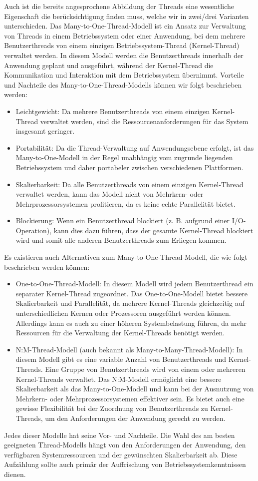 Auch ist die bereits angesprochene Abbildung der Threads eine wesentliche Eigenschaft die berücksichtigung finden muss, welche wir in zwei/drei Varianten unterschieden. Das Many-to-One-Thread-Modell ist ein Ansatz zur Verwaltung von Threads in einem Betriebssystem oder einer Anwendung, bei dem mehrere Benutzerthreads von einem einzigen Betriebssystem-Thread (Kernel-Thread) verwaltet werden. In diesem Modell werden die Benutzerthreads innerhalb der Anwendung geplant und ausgeführt, während der Kernel-Thread die Kommunikation und Interaktion mit dem Betriebssystem übernimmt. Vorteile und Nachteile des Many-to-One-Thread-Modells können wir folgt beschrieben werden:
\begin{itemize}
\item Leichtgewicht: Da mehrere Benutzerthreads von einem einzigen Kernel-Thread verwaltet werden, sind die Ressourcenanforderungen für das System insgesamt geringer.
\item Portabilität: Da die Thread-Verwaltung auf Anwendungsebene erfolgt, ist das Many-to-One-Modell in der Regel unabhängig vom zugrunde liegenden Betriebssystem und daher portabeler zwischen verschiedenen Plattformen.
\item Skalierbarkeit: Da alle Benutzerthreads von einem einzigen Kernel-Thread verwaltet werden, kann das Modell nicht von Mehrkern- oder Mehrprozessorsystemen profitieren, da es keine echte Parallelität bietet.
\item Blockierung: Wenn ein Benutzerthread blockiert (z. B. aufgrund einer I/O-Operation), kann dies dazu führen, dass der gesamte Kernel-Thread blockiert wird und somit alle anderen Benutzerthreads zum Erliegen kommen.
\end{itemize}
Es existieren auch Alternativen zum Many-to-One-Thread-Modell, die wie folgt beschrieben werden können:
\begin{itemize}
\item One-to-One-Thread-Modell: In diesem Modell wird jedem Benutzerthread ein separater Kernel-Thread zugeordnet. Das One-to-One-Modell bietet bessere Skalierbarkeit und Parallelität, da mehrere Kernel-Threads gleichzeitig auf unterschiedlichen Kernen oder Prozessoren ausgeführt werden können. Allerdings kann es auch zu einer höheren Systembelastung führen, da mehr Ressourcen für die Verwaltung der Kernel-Threads benötigt werden.
\item N:M-Thread-Modell (auch bekannt als Many-to-Many-Thread-Modell): In diesem Modell gibt es eine variable Anzahl von Benutzerthreads und Kernel-Threads. Eine Gruppe von Benutzerthreads wird von einem oder mehreren Kernel-Threads verwaltet. Das N:M-Modell ermöglicht eine bessere Skalierbarkeit als das Many-to-One-Modell und kann bei der Ausnutzung von Mehrkern- oder Mehrprozessorsystemen effektiver sein. Es bietet auch eine gewisse Flexibilität bei der Zuordnung von Benutzerthreads zu Kernel-Threads, um den Anforderungen der Anwendung gerecht zu werden.
\end{itemize}
Jedes dieser Modelle hat seine Vor- und Nachteile. Die Wahl des am besten geeigneten Thread-Modells hängt von den Anforderungen der Anwendung, den verfügbaren Systemressourcen und der gewünschten Skalierbarkeit ab. Diese Aufzählung sollte auch primär der Auffrischung von Betriebssystemkenntnissen dienen. 

